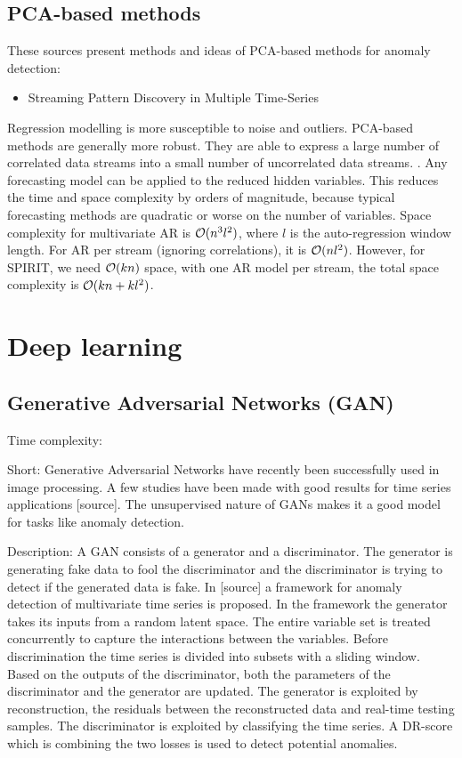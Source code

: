 
\subsection{PCA-based methods} These sources present methods and ideas of PCA-based methods for anomaly detection:
\begin{itemize}
    \item Streaming Pattern Discovery in Multiple Time-Series \cite{Papadimitriou2005StreamingTime-series}
\end{itemize}

Regression modelling is more susceptible to noise and outliers. PCA-based methods are generally more robust. They are able to express a large number of correlated data streams into a small number of uncorrelated data streams. \cite{Aggarwal2013a}. Any forecasting model can be applied to the reduced hidden variables. This reduces the time and space complexity by orders of magnitude, because typical forecasting methods are quadratic or worse on the number of variables. Space complexity for multivariate AR is $\mathcal{O}{(n^3l^2)}$, where $l$ is the auto-regression window length. For AR per stream (ignoring correlations), it is $\mathcal{O}{(nl^2)}$. However, for SPIRIT, we need $\mathcal{O}{(kn)}$ space, with one AR model per stream, the total space complexity is $\mathcal{O}{(kn+kl^2)}$. \cite{Papadimitriou2005StreamingTime-series}


\section{Deep learning}

\subsection{Generative Adversarial Networks (GAN)}

Time complexity:


Short:
Generative Adversarial Networks have recently been successfully used in image processing. A few studies have been made with good results for time series applications [source]. The unsupervised nature of GANs makes it a good model for tasks like anomaly detection.

Description:
A GAN consists of a generator and a discriminator. The generator is generating fake data to fool the discriminator and the discriminator is trying to detect if the generated data is fake. In [source] a framework for anomaly detection of multivariate time series is proposed. In the framework the generator takes its inputs from a random latent space. The entire variable set is treated concurrently to capture the interactions between the variables. Before discrimination the time series is divided into subsets with a sliding window. Based on the outputs of the discriminator, both the parameters of the discriminator and the generator are updated. The generator is exploited by reconstruction, the residuals between the reconstructed data and real-time testing samples. The discriminator is exploited by classifying the time series. A DR-score which is combining the two losses is used to detect potential anomalies.


